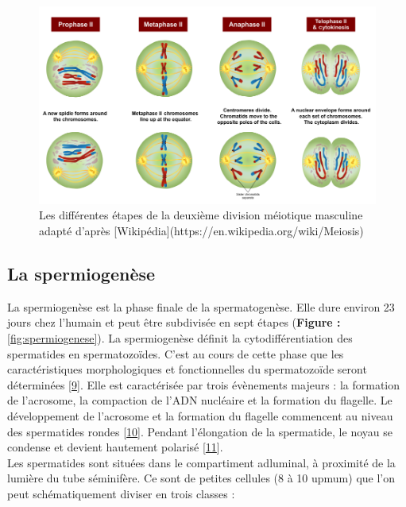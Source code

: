 \documentclass[12pt,twoside]{ugathesis}
\theoremstyle{definition}
\theoremstyle{definition}
\theoremstyle{remark}
\begin{document}
\begin{figure}

{\centering \includegraphics[scale=0.43]{figure/MeiosisII} 

}

\caption[Les différentes étapes de la deuxième division méiotique masculine adapté]{Les différentes étapes de la deuxième division méiotique masculine adapté d'après [Wikipédia](https://en.wikipedia.org/wiki/Meiosis)}\label{fig:meioseii}
\end{figure}

\newpage

\hypertarget{spermiogenese}{\subsection{La
spermiogenèse}\label{spermiogenese}}

La spermiogenèse est la phase finale de la spermatogenèse. Elle dure
environ 23 jours chez l'humain et peut être subdivisée en sept étapes
(\textbf{Figure : }\ref{fig:spermiogenese}). La spermiogenèse définit la
cytodifférentiation des spermatides en spermatozoïdes. C'est au cours de
cette phase que les caractéristiques morphologiques et fonctionnelles du
spermatozoïde seront déterminées
{[}\protect\hyperlink{ref-YvesClermontRichardOko1993}{9}{]}. Elle est
caractérisée par trois évènements majeurs : la formation de l'acrosome,
la compaction de l'ADN nucléaire et la formation du flagelle. Le
développement de l'acrosome et la formation du flagelle commencent au
niveau des spermatides rondes
{[}\protect\hyperlink{ref-Escalier1991}{10}{]}. Pendant l'élongation de
la spermatide, le noyau se condense et devient hautement polarisé
{[}\protect\hyperlink{ref-Hamilton1987}{11}{]}.\\
Les spermatides sont situées dans le compartiment adluminal, à proximité
de la lumière du tube séminifère. Ce sont de petites cellules (8 à 10
upmum) que l'on peut schématiquement diviser en trois classes :
\end{document}
